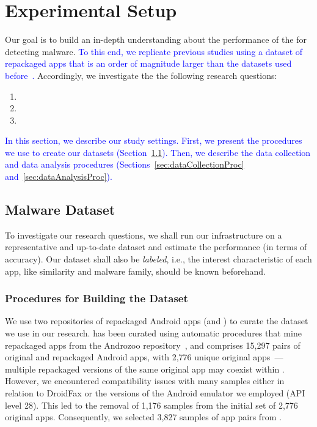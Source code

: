 \section{Experimental Setup}\label{sec:experimentalSetup}

Our goal is to build an in-depth understanding about
the performance of the \mas for detecting malware. \textcolor{blue}{To this
end, we replicate previous studies using a dataset of repackaged apps that is an order of magnitude
larger than the datasets used before~\cite{DBLP:conf/wcre/BaoLL18,DBLP:journals/jss/CostaMMSSBNR22}.} Accordingly,
we investigate the the following research questions:

\begin{enumerate}[(RQ1)]
\item \rqa
\item \rqc
\item \rqd
\end{enumerate}

\textcolor{blue}{In this section, we describe our study settings. First, we present the procedures we use to create our datasets (Section~\ref{sec:dataset}).  Then, we describe the data collection and data analysis procedures (Sections~\ref{sec:dataCollectionProc} and~\ref{sec:dataAnalysisProc}).}


\subsection{Malware Dataset}\label{sec:dataset}


To investigate our research questions, we shall run our infrastructure on a representative and up-to-date dataset and estimate the \mas performance (in terms of accuracy). Our dataset shall also
be \textit{labeled}, i.e., the interest characteristic of each app, like similarity and malware family, should be known beforehand. 

\subsubsection{Procedures for Building the Dataset}

We use two repositories of repackaged Android apps (\repack and \amc) to
curate the dataset we use in our research. \repack has been curated using automatic procedures that mine repackaged apps from the Androzoo
repository~\cite{DBLP:conf/msr/AllixBKT16}, and
comprises 15,297 pairs of original and repackaged Android apps, with 2,776 unique original apps~\cite{DBLP:journals/tse/LiBK21}---
multiple repackaged versions of the same original app may coexist within \repack.
However, we encountered compatibility issues with many samples either in relation to DroidFax or the versions of the Android emulator we employed (API level 28).
This led to the removal of 1,176 samples from the initial set of 2,776 original apps. Consequently, we selected 3,827 samples of app pairs from \repack.


